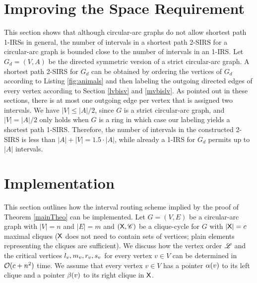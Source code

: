 \documentclass[10pt]{article}
\newcommand{\rvv}{\rv{v}}
\newcommand{\mvv}{\mv{v}}
\newcommand{\svv}{s_v}
\begin{document}
\section{Improving the Space Requirement}\label{improving}



This section shows that although circular-arc graphs do not allow shortest path 1-IRSs in general, 
the number of intervals in a shortest path 2-SIRS for a circular-arc graph is 
bounded close to the number of intervals in an 1-IRS.
Let $G_d=(V,A)$ be the directed symmetric version of a strict circular-arc graph.
A shortest path 2-SIRS for $G_d$ can be obtained by ordering the vertices of $G_d$ 
according to Listing \ref{fig:animals}
and then labeling the outgoing directed edges of every vertex according to 
Section \ref{lvbisv} and \ref{mvbislv}.
As pointed out in these sections, there is at most one outgoing edge per vertex that is assigned two intervals.
We have $|V|\leq|A|/2$, since $G$ is a strict circular-arc graph, and $|V|=|A|/2$ only holds when $G$ is a ring in which case our labeling yields a shortest path 1-SIRS.
Therefore, the number of intervals in the constructed 2-SIRS is less than $|A|+|V| = 1.5\cdot |A|$, while already a 1-IRS for $G_d$ permits up to $|A|$ intervals.






\section{Implementation}\label{implement}


This section outlines how the interval routing scheme implied by the proof 
of Theorem \ref{mainTheo} can be implemented.
Let $G=(V,E)$ be a circular-arc graph with $|V|=n$ and $|E|=m$ and 
$(\mathsf{X},\mathscr{C})$ be a clique-cycle for $G$ with $|\mathsf{X}|=c$
maximal cliques ($\mathsf{X}$ does not need to contain sets of vertices; plain 
elements representing the cliques are sufficient).
We discuss how the vertex order $\mathscr{L}$ and the critical vertices 
$\lvv,\mvv,\rvv,\svv$ for every vertex $v\in V$ can be determined in $\mathcal{O}(c+n^2)$ time.
We assume that every vertex $v\in V$ has a pointer $\alpha(v)$ to 
its left clique and a pointer $\beta(v)$ to its right clique in $\mathsf{X}$.
\end{document}

